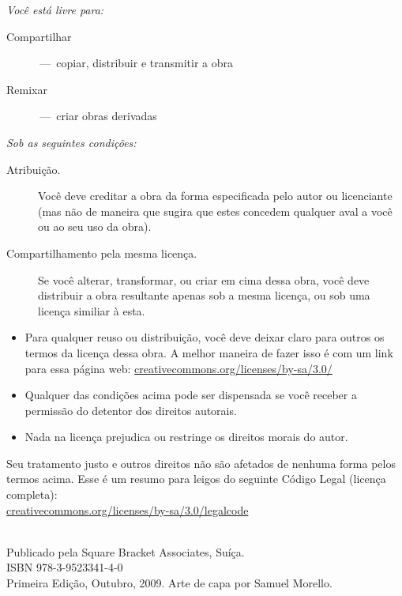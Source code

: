 \documentclass[a4paper,10pt,twoside]{book}
\begin{document}
\begin{footnotesize}
\emph{Você está livre para:}
\begin{description}
  \item[Compartilhar] \,---\, copiar, distribuir e transmitir a obra
  \item[Remixar] \,---\, criar obras derivadas
\end{description}
\emph{Sob as seguintes condições:}
\begin{description}
  \item[Atribuição.] Você deve creditar a obra da forma especificada pelo autor ou licenciante (mas não de maneira que sugira que estes concedem qualquer aval a você ou ao seu uso da obra).
  \item[Compartilhamento pela mesma licença.] Se você alterar, transformar, ou criar em cima dessa obra, você deve distribuir a obra resultante apenas sob a mesma licença, ou sob uma licença similiar à esta.
\end{description}
\begin{itemize}
  \item Para qualquer reuso ou distribuição, você deve deixar claro para outros os termos da licença dessa obra. A melhor maneira de fazer isso é com um link para essa página web:
  \url{creativecommons.org/licenses/by-sa/3.0/}
  \item Qualquer das condições acima pode ser dispensada se você receber a permissão do detentor dos direitos autorais.
  \item Nada na licença prejudica ou restringe os direitos morais do autor.
\end{itemize}
\quad
\parbox{\textwidth-2cm-1em}{
	Seu tratamento justo e outros direitos não são afetados de nenhuma forma pelos termos acima.
	Esse é um resumo para leigos do seguinte Código Legal (licença completa):\\
	\url{creativecommons.org/licenses/by-sa/3.0/legalcode}}\\[1cm]
Publicado pela Square Bracket Associates, Suíça. \sba\\
ISBN 978-3-9523341-4-0\\
Primeira Edição, Outubro, 2009.
Arte de capa por Samuel Morello.
\end{footnotesize}
\vfill
%
\tableofcontents
\sloppy %

\mainmatter
\end{document}
